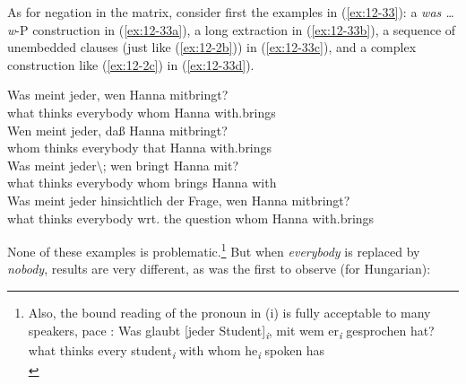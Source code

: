 \documentclass[output=paper]{langsci/langscibook}
\begin{document}
As for negation in the matrix, consider first the examples in (\ref{ex:12-33}): a
\textit{was \ldots{}  w}-P construction in (\ref{ex:12-33a}), a long extraction in
(\ref{ex:12-33b}), a sequence of unembedded clauses (just like (\ref{ex:12-2b})) in (\ref{ex:12-33c}),
and a complex construction like (\ref{ex:12-2c}) in (\ref{ex:12-33d}).
\begin{exe}
\ex
\label{ex:12-33}
\begin{xlist}
\ex
\label{ex:12-33a}
\gll
Was meint jeder, wen Hanna mitbringt?\\
what thinks everybody whom Hanna with.brings \\
\ex
\label{ex:12-33b}
\gll
Wen meint jeder, daß Hanna mitbringt?\\
whom thinks everybody that Hanna with.brings \\
\ex
\label{ex:12-33c}
\gll
Was meint jeder$\setminus$; wen bringt Hanna mit?\\
what thinks everybody whom brings Hanna with \\
\ex
\label{ex:12-33d}
\gll
Was meint jeder hinsichtlich der Frage, wen Hanna mitbringt?\\
what thinks everybody wrt. the question whom Hanna with.brings \\
\end{xlist}
\end{exe}
None of these examples is problematic.\footnote{%
	Also, the bound
  reading of the pronoun in (i) is fully acceptable to many speakers,
  pace \citet[152 (21b)]{Dayal1994}:
\ea
\label{ex:12-fn11i}
\gll
Was glaubt  [jeder Student]\textsubscript{\textit{i}}, mit wem er\textsubscript{\textit{i}} gesprochen hat?\\
what thinks every student\textsubscript{\textit{i}} with whom he\textsubscript{\textit{i}} spoken has \\
\zlast%
}
But when \textit{everybody} is replaced by \emph{nobody}, results are very different, as
\citet[214]{Kiss1988} was the first to observe (for Hungarian):
\begin{exe}
\ex
\label{ex:12-34}
\begin{xlist}
\end{xlist}
\end{exe}
\end{document}
